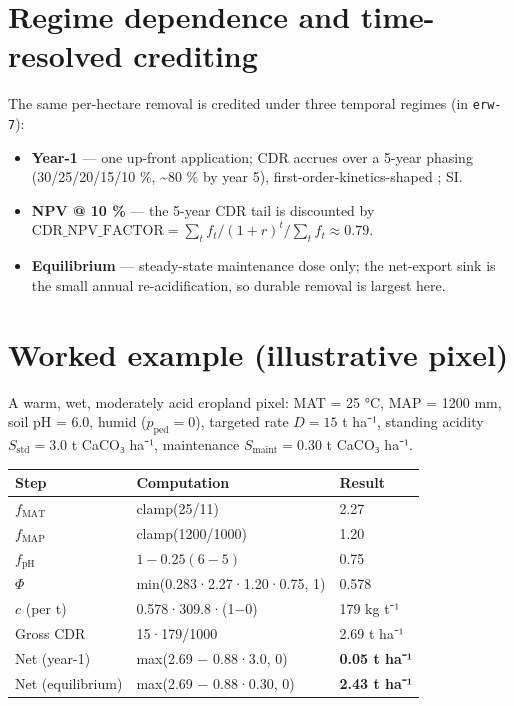 \documentclass[openany]{book}
\newcounter{none} %
\providecommand{\tightlist}{%
  \setlength{\itemsep}{0pt}\setlength{\parskip}{0pt}}
\begin{document}
\chapter{Regime dependence and time-resolved crediting}\label{ch:regime}

The same per-hectare removal is credited under three temporal regimes (in
\texttt{erw-7}):

\begin{itemize}
\tightlist
\item
  \textbf{Year-1} --- one up-front application; CDR accrues over a 5-year phasing
  (30/25/20/15/10 \%, \textasciitilde80 \% by year 5), first-order-kinetics-shaped
  \citep{kanzaki2023}; \citet{beerling2020} SI.
\item
  \textbf{NPV @ 10 \%} --- the 5-year CDR tail is discounted by
  \(\text{CDR\_NPV\_FACTOR}=\sum_t f_t/(1+r)^t \big/ \sum_t f_t \approx 0.79\).
\item
  \textbf{Equilibrium} --- steady-state maintenance dose only; the net-export
  sink is the small annual re-acidification, so durable removal is largest here.
\end{itemize}

\chapter{Worked example (illustrative pixel)}\label{ch:worked}

A warm, wet, moderately acid cropland pixel: MAT = 25 °C, MAP = 1200 mm, soil pH
= 6.0, humid (\(p_{\text{ped}}=0\)), targeted rate \(D=15\) t ha⁻¹, standing
acidity \(S_{\text{std}}=3.0\) t CaCO₃ ha⁻¹, maintenance
\(S_{\text{maint}}=0.30\) t CaCO₃ ha⁻¹.

{\def\LTcaptype{none} %
\begin{longtable}[]{@{}lll@{}}
\toprule\noalign{}
Step & Computation & Result \\
\midrule\noalign{}
\endhead
\bottomrule\noalign{}
\endlastfoot
\(f_{\text{MAT}}\) & clamp(25/11) & 2.27 \\
\(f_{\text{MAP}}\) & clamp(1200/1000) & 1.20 \\
\(f_{\text{pH}}\) & \(1-0.25(6-5)\) & 0.75 \\
\(\Phi\) & min(0.283·2.27·1.20·0.75, 1) & 0.578 \\
\(c\) (per t) & 0.578·309.8·(1−0) & 179 kg t⁻¹ \\
Gross CDR & 15·179/1000 & 2.69 t ha⁻¹ \\
Net (year-1) & max(2.69 − 0.88·3.0, 0) & \textbf{0.05 t ha⁻¹} \\
Net (equilibrium) & max(2.69 − 0.88·0.30, 0) & \textbf{2.43 t ha⁻¹} \\
\end{longtable}
}
\end{document}
